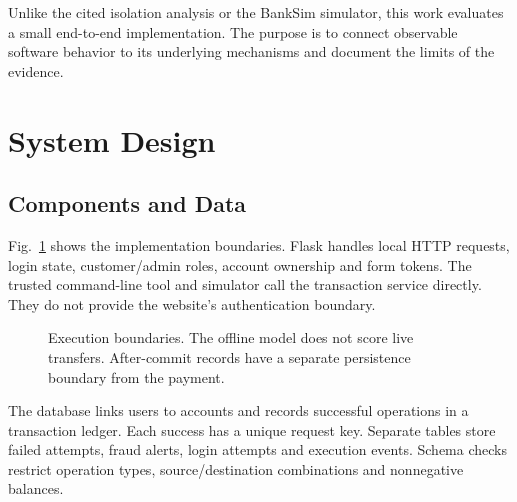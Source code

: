 \documentclass[conference]{IEEEtran}
\begin{document}
Unlike the cited isolation analysis or the BankSim simulator, this work evaluates a small end-to-end implementation. The purpose is to connect observable software behavior to its underlying mechanisms and document the limits of the evidence.

\section{System Design}
\subsection{Components and Data}
Fig.~\ref{fig:architecture} shows the implementation boundaries. Flask handles local HTTP requests, login state, customer/admin roles, account ownership and form tokens. The trusted command-line tool and simulator call the transaction service directly. They do not provide the website's authentication boundary.

\begin{figure}[t]
\centering
{}
\caption{Execution boundaries. The offline model does not score live transfers. After-commit records have a separate persistence boundary from the payment.}
\label{fig:architecture}
\end{figure}

The database links users to accounts and records successful operations in a transaction ledger. Each success has a unique request key. Separate tables store failed attempts, fraud alerts, login attempts and execution events. Schema checks restrict operation types, source/destination combinations and nonnegative balances.
\end{document}
